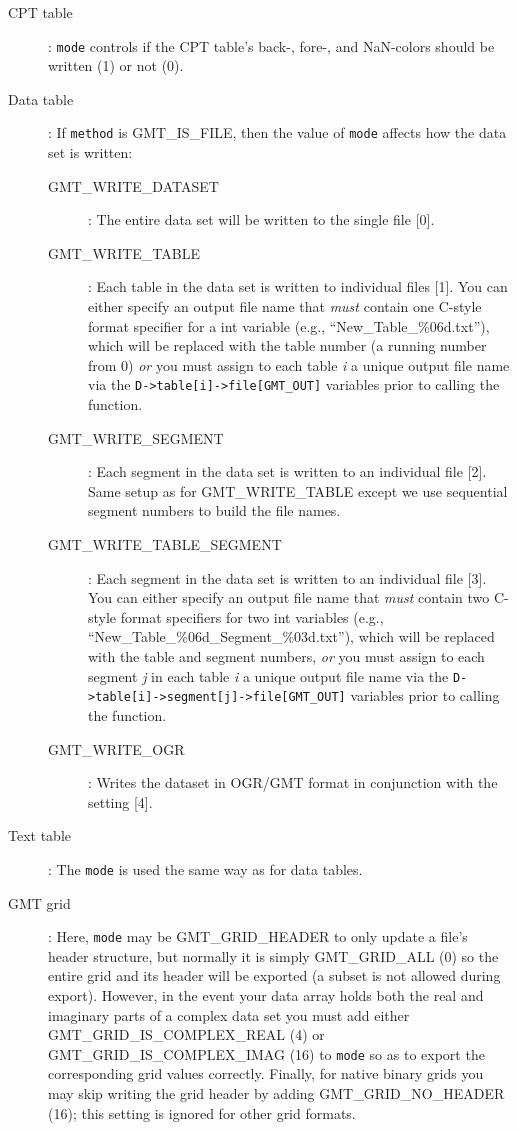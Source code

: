 \documentclass[11pt]{report}
\begin{document}
\begin{description}
\item [CPT table]: \texttt{mode} controls if the CPT table's back-, fore-, and NaN-colors
should be written (1) or not (0).
\item [Data table]: If \texttt{method} is GMT\_IS\_FILE, then the value of
\texttt{mode} affects how the data set is written:
\begin{description}
\item [GMT\_WRITE\_DATASET]: The entire data set will be written to the single file [0].
\item [GMT\_WRITE\_TABLE]: Each table in the data set is written to individual files [1].
You can either specify an output file name that \emph{must} contain one C-style
format specifier for a int variable (e.g., ``New\_Table\_\%06d.txt''), which will be
replaced with the table number (a running number from 0) \emph{or} you must assign
to each table \emph{i} a unique output file name via the \texttt{D->table[i]->file[GMT\_OUT]}
variables prior to calling the function.
\item [GMT\_WRITE\_SEGMENT]: Each segment in the data set is written to an individual file [2].
Same setup as for GMT\_WRITE\_TABLE except we use sequential segment numbers to build the file names.
\item [GMT\_WRITE\_TABLE\_SEGMENT]: Each segment in the data set is written to an individual file [3].
You can either specify an output file name that \emph{must} contain two C-style
format specifiers for two int variables (e.g., ``New\_Table\_\%06d\_Segment\_\%03d.txt''),
which will be replaced with the table and segment numbers, \emph{or}
you must assign to each segment \emph{j} in each table \emph{i} a unique output file name
via the \texttt{D->table[i]->segment[j]->file[GMT\_OUT]} variables prior to calling the function.
\item [GMT\_WRITE\_OGR]: Writes the dataset in OGR/GMT format in conjunction with the  setting [4].
\end{description}
\item [Text table]: The \texttt{mode} is used the same way as for data tables.
\item [GMT grid]: Here, \texttt{mode} may be GMT\_GRID\_HEADER to only update a file's header
structure, but normally it is simply GMT\_GRID\_ALL (0) so the entire
grid and its header will be exported (a subset is not allowed during export).
However, in the event your data array holds both the real and imaginary parts of a
complex data set you must add either GMT\_GRID\_IS\_COMPLEX\_REAL (4) or GMT\_GRID\_IS\_COMPLEX\_IMAG (16) to \texttt{mode}
so as to export the corresponding grid values correctly.  Finally, for native binary grids you may skip writing
the grid header by adding GMT\_GRID\_NO\_HEADER (16); this setting is ignored for other grid formats.
\end{description}
\end{document}
